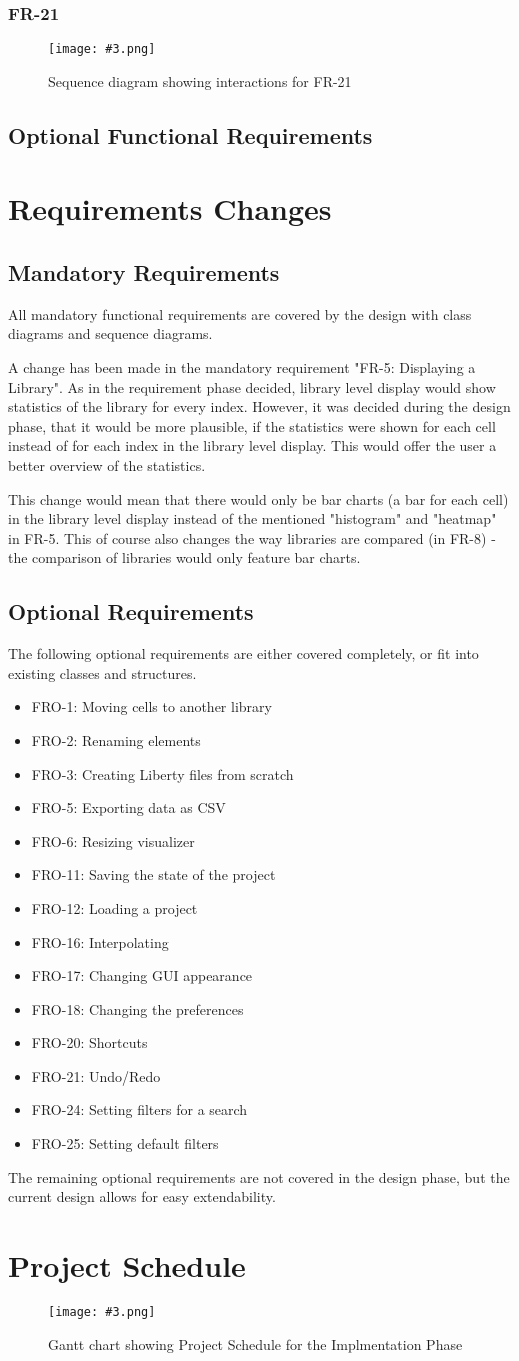 \documentclass[10pt,a4paper]{report}
\newcommand{\includeimage}[5]{
    \begin{figure}[H]
        #1
        \texttt{[image: \#3.png]}
        \caption{#4}
        \label{fig:#5}
    \end{figure}
}
\newcommand{\patternentry}[2]{
    #1{#2}
}
\newcommand{\pattern}[2]{
    \patternentry{\section}{#1}
    {#2}
}
\begin{document}
\subsection{FR-21}
\includeimage{}{0.35}{FR-21}{Sequence diagram showing interactions for FR-21}{Saving a Library as a new File}
\section{Optional Functional Requirements}


\chapter{Requirements Changes}
\pattern{Mandatory Requirements}
{All mandatory functional requirements are covered by the design with class diagrams and sequence diagrams. \newline


A change has been made in the mandatory requirement "FR-5: Displaying a Library". As in the requirement phase decided, library level display would show statistics of the library for every index. However, it was decided during the design phase, that it would be more plausible, if the statistics were shown for each cell instead of for each index in the library level display. This would offer the user a better overview of the statistics. \newline

This change would mean that there would only be bar charts (a bar for each cell) in the library level display instead of the mentioned "histogram" and "heatmap" in FR-5. This of course also changes the way libraries are compared (in FR-8) - the comparison of libraries would only feature bar charts. }
\pattern{Optional Requirements}
{The following optional requirements are either covered completely, or fit into existing classes and structures. 
\begin{itemize}
    \item {FRO-1: Moving cells to another library}
    \item {FRO-2: Renaming elements}
    \item {FRO-3: Creating Liberty files from scratch}
    \item {FRO-5: Exporting data as CSV}
    \item {FRO-6: Resizing visualizer}
    \item {FRO-11: Saving the state of the project} 
    \item {FRO-12: Loading a project}
    \item {FRO-16: Interpolating}
    \item {FRO-17: Changing GUI appearance} 
    \item {FRO-18: Changing the preferences}
    \item {FRO-20: Shortcuts} 
    \item {FRO-21: Undo/Redo} 
    \item {FRO-24: Setting filters for a search} 
    \item {FRO-25: Setting default filters} 
\end{itemize}}
The remaining optional requirements are not covered in the design phase, but the current design allows for easy extendability.

\chapter{Project Schedule}
\includeimage{}{0.37}{ganttchart}{Gantt chart showing Project Schedule for the Implmentation Phase}{Gantt Chart}
\end{document}
